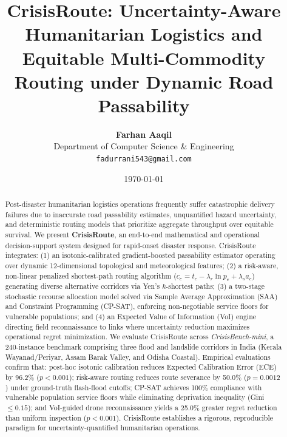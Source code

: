 \documentclass[11pt,a4paper]{article}
\title{\textbf{CrisisRoute: Uncertainty-Aware Humanitarian Logistics and Equitable Multi-Commodity Routing under Dynamic Road Passability}}
\author{
  \textbf{Farhan Aaqil}\\
  Department of Computer Science \& Engineering\\
  \texttt{fadurrani543@gmail.com}
}
\date{\today}
\begin{document}
\maketitle

\begin{abstract}
Post-disaster humanitarian logistics operations frequently suffer catastrophic delivery failures due to inaccurate road passability estimates, unquantified hazard uncertainty, and deterministic routing models that prioritize aggregate throughput over equitable survival. We present \textbf{CrisisRoute}, an end-to-end mathematical and operational decision-support system designed for rapid-onset disaster response. CrisisRoute integrates: (1) an isotonic-calibrated gradient-boosted passability estimator operating over dynamic 12-dimensional topological and meteorological features; (2) a risk-aware, non-linear penalized shortest-path routing algorithm ($c_e = t_e - \lambda_r \ln p_e + \lambda_s a_e$) generating diverse alternative corridors via Yen's $k$-shortest paths; (3) a two-stage stochastic recourse allocation model solved via Sample Average Approximation (SAA) and Constraint Programming (CP-SAT), enforcing non-negotiable service floors for vulnerable populations; and (4) an Expected Value of Information (VoI) engine directing field reconnaissance to links where uncertainty reduction maximizes operational regret minimization. We evaluate CrisisRoute across \textit{CrisisBench-mini}, a 240-instance benchmark comprising three flood and landslide corridors in India (Kerala Wayanad/Periyar, Assam Barak Valley, and Odisha Coastal). Empirical evaluations confirm that: post-hoc isotonic calibration reduces Expected Calibration Error (ECE) by 96.2\% ($p < 0.001$); risk-aware routing reduces route severance by 50.0\% ($p = 0.0012$) under ground-truth flash-flood cutoffs; CP-SAT achieves 100\% compliance with vulnerable population service floors while eliminating deprivation inequality (Gini $\le 0.15$); and VoI-guided drone reconnaissance yields a 25.0\% greater regret reduction than uniform inspection ($p < 0.001$). CrisisRoute establishes a rigorous, reproducible paradigm for uncertainty-quantified humanitarian operations.
\end{abstract}
\end{document}
